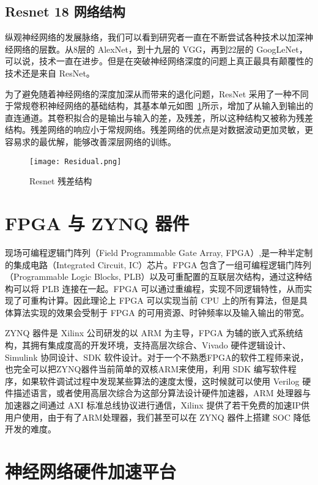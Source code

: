 \subsection{Resnet 18 网络结构}

纵观神经网络的发展脉络，我们可以看到研究者一直在不断尝试各种技术以加深神经网络的层数。从8层的 AlexNet，到十九层的 VGG，再到22层的 GoogLeNet，可以说，技术一直在进步。但是在突破神经网络深度的问题上真正最具有颠覆性的技术还是来自 ResNet。

为了避免随着神经网络的深度加深从而带来的退化问题，ResNet 采用了一种不同于常规卷积神经网络的基础结构，其基本单元如图~\ref{fig:Residual}所示，增加了从输入到输出的直连通道。其卷积拟合的是输出与输入的差，及残差，所以这种结构又被称为残差结构。残差网络的响应小于常规网络\citep{DBLP:journals/corr/HeZRS15}。残差网络的优点是对数据波动更加灵敏，更容易求的最优解，能够改善深层网络的训练。

\begin{figure}[!htbp]
    \centering
    \texttt{[image: Residual.png]}
    \caption{Resnet 残差结构}
    \label{fig:Residual}
\end{figure}


\section{FPGA 与 ZYNQ 器件}

现场可编程逻辑门阵列（Field Programmable Gate Array, FPGA）,是一种半定制的集成电路（Integrated Circuit, IC）芯片。FPGA 包含了一组可编程逻辑门阵列（Programmable Logic Blocks, PLB）以及可重配置的互联层次结构，通过这种结构可以将 PLB 连接在一起。FPGA 可以通过重编程，实现不同逻辑特性，从而实现了可重构计算。因此理论上 FPGA 可以实现当前 CPU 上的所有算法，但是具体算法实现的效果会受制于 FPGA 的可用资源、时钟频率以及输入输出的带宽。

ZYNQ 器件是 Xilinx 公司研发的以 ARM 为主导，FPGA 为辅的嵌入式系统结构，其拥有集成度高的开发环境，支持高层次综合、Vivado 硬件逻辑设计、Simulink 协同设计、SDK 软件设计。对于一个不熟悉FPGA的软件工程师来说，也完全可以把ZYNQ器件当前简单的双核ARM来使用，利用 SDK 编写软件程序，如果软件调试过程中发现某些算法的速度太慢，这时候就可以使用 Verilog 硬件描述语言，或者使用高层次综合为这部分算法设计硬件加速器，ARM 处理器与加速器之间通过 AXI 标准总线协议进行通信，Xilinx 提供了若干免费的加速IP供用户使用，由于有了ARM处理器，我们甚至可以在 ZYNQ 器件上搭建 SOC 降低开发的难度。

\section{神经网络硬件加速平台}


